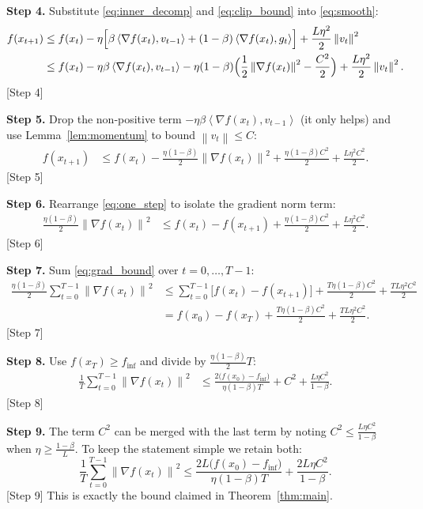 \documentclass[11pt]{article}
\newcommand{\norm}[1]{\left\lVert #1\right\rVert}
\newcommand{\inner}[2]{\left\langle #1, #2 \right\rangle}
\newcommand{\grad}{\nabla}
\begin{document}
\noindent\textbf{Step 4.} Substitute \eqref{eq:inner_decomp} and \eqref{eq:clip_bound} into \eqref{eq:smooth}:
\begin{align}
    f(x_{t+1})
    &\le f(x_t)-\eta\Bigl[\beta\inner{\grad f(x_t)}{v_{t-1}}+(1-\beta)\inner{\grad f(x_t)}{g_t}\Bigr]
      +\frac{L\eta^2}{2}\norm{v_t}^2 \nonumber\\
    &\le f(x_t)-\eta\beta\inner{\grad f(x_t)}{v_{t-1}}
      -\eta(1-\beta)\Bigl(\frac12\norm{\grad f(x_t)}^2-\frac{C^2}{2}\Bigr)
      +\frac{L\eta^2}{2}\norm{v_t}^2 . \label{eq:intermediate}
\end{align}
[Step 4]

\noindent\textbf{Step 5.} Drop the non‑positive term $-\eta\beta\inner{\grad f(x_t)}{v_{t-1}}$ (it only helps) and use Lemma~\ref{lem:momentum} to bound $\norm{v_t}\le C$:
\begin{align}
    f(x_{t+1})
    &\le f(x_t)-\frac{\eta(1-\beta)}{2}\norm{\grad f(x_t)}^2
      +\frac{\eta(1-\beta)C^2}{2}
      +\frac{L\eta^2 C^2}{2} . \label{eq:one_step}
\end{align}
[Step 5]

\noindent\textbf{Step 6.} Rearrange \eqref{eq:one_step} to isolate the gradient norm term:
\begin{align}
    \frac{\eta(1-\beta)}{2}\norm{\grad f(x_t)}^2
    &\le f(x_t)-f(x_{t+1}) +\frac{\eta(1-\beta)C^2}{2}+ \frac{L\eta^2 C^2}{2}. \label{eq:grad_bound}
\end{align}
[Step 6]

\noindent\textbf{Step 7.} Sum \eqref{eq:grad_bound} over $t=0,\dots,T-1$:
\begin{align}
    \frac{\eta(1-\beta)}{2}\sum_{t=0}^{T-1}\norm{\grad f(x_t)}^2
    &\le \sum_{t=0}^{T-1}\bigl[f(x_t)-f(x_{t+1})\bigr]
      +\frac{T\eta(1-\beta)C^2}{2}+ \frac{TL\eta^2 C^2}{2} \nonumber\\
    &= f(x_0)-f(x_T)+\frac{T\eta(1-\beta)C^2}{2}+ \frac{TL\eta^2 C^2}{2}. \label{eq:sum}
\end{align}
[Step 7]

\noindent\textbf{Step 8.} Use $f(x_T)\ge f_{\inf}$ and divide by $\frac{\eta(1-\beta)}{2}T$:
\begin{align}
    \frac{1}{T}\sum_{t=0}^{T-1}\norm{\grad f(x_t)}^2
    &\le \frac{2\bigl(f(x_0)-f_{\inf}\bigr)}{\eta(1-\beta)T}
      + C^2 + \frac{L\eta C^2}{1-\beta}. \label{eq:avg_bound}
\end{align}
[Step 8]

\noindent\textbf{Step 9.} The term $C^2$ can be merged with the last term by noting $C^2\le \frac{L\eta C^2}{1-\beta}$ when $\eta\ge \frac{1-\beta}{L}$. To keep the statement simple we retain both:
\[
    \frac{1}{T}\sum_{t=0}^{T-1}\norm{\grad f(x_t)}^2
    \le \frac{2L\bigl(f(x_0)-f_{\inf}\bigr)}{\eta(1-\beta)T}
      +\frac{2L\eta C^2}{1-\beta}.
\]
[Step 9] This is exactly the bound claimed in Theorem~\ref{thm:main}.
\end{document}
